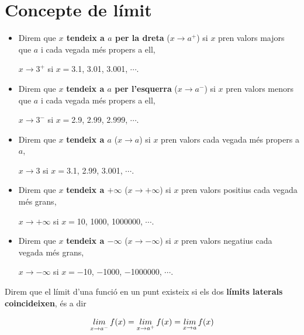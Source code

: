 

\section{Concepte de límit}

\begin{blueshaded}
	\begin{itemize}
		 
	\item Direm que \textbf{$x$ tendeix a $a$ per la dreta} ($x \to a^+$) si $x$ pren valors majors que $a$ i cada vegada més propers a ell,
	
	\quad $x \to 3^+$ \quad si \quad $x=$3.1, 3.01, 3.001, $\cdots$.
	
	\item Direm que $x$ \textbf{tendeix a $a$ per l'esquerra} ($x \to a^-$) si $x$ pren valors menors que $a$ i cada vegada més propers a ell,
	
	\quad $x \to 3^-$ \quad si \quad $x=$2.9, 2.99, 2.999, $\cdots$.
	
	\item Direm que $x$ \textbf{tendeix a $a$}  ($x \to a$) si $x$ pren valors  cada vegada més propers a $a$,
	
	\quad $x \to 3$ \quad si \quad $x=$3.1, 2.99, 3.001, $\cdots$.

\item Direm que $x$ \textbf{tendeix a $+\infty$}  ($x \to +\infty$) si $x$ pren valors positius cada vegada més grans,

\quad $x \to  +\infty$ \quad si \quad $x=$10, 1000, 1000000, $\cdots$.

\item Direm que $x$ \textbf{tendeix a $-\infty$ } ($x \to -\infty$) si $x$ pren valors negatius cada vegada més grans,

\quad $x \to -\infty$ \quad si \quad $x=-$10, $-$1000, $-$1000000, $\cdots$.
	\end{itemize}
\end{blueshaded}

\begin{theorybox}
 
	  Direm que el límit d'una funció en un punt existeix si els dos \textbf{límits laterals coincideixen}, és a dir
	  
	  \begin{equation*}
	  \mathop{lim}\limits_{x\to a^-} f(x) = \mathop{lim}\limits_{x\to a^+} f(x) = \mathop{lim}\limits_{x\to a} f(x)
	  \end{equation*}
\end{theorybox}

